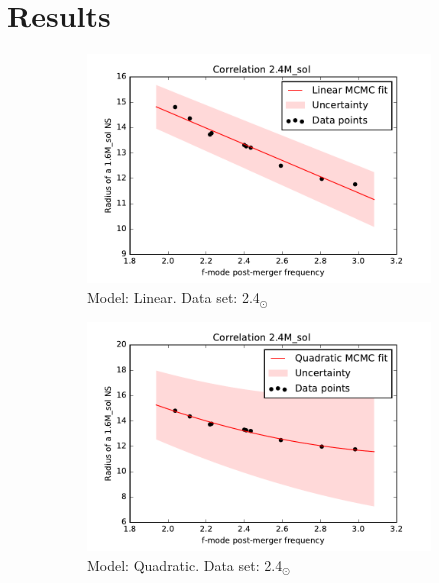 \documentclass[a4paper,11pt]{article}
\begin{document}
\section{Results}
\begin{figure} [h]
    \centering
    \begin{subfigure}[b]{0.45\textwidth}
        \includegraphics[width=\textwidth]{linear_fit.pdf}
        \caption{Model: Linear. Data set: 2.4$_{\odot}$}
        \label{im2}
    \end{subfigure} 
    \begin{subfigure}[b]{0.45\textwidth}
        \includegraphics[width=\textwidth]{quadratic_fit.pdf}
        \caption{Model: Quadratic. Data set: 2.4$_{\odot}$}
        \label{im3}
    \end{subfigure} 
    \begin{subfigure}[b]{0.45\textwidth}

\end{subfigure}
\end{figure}
\end{document}
